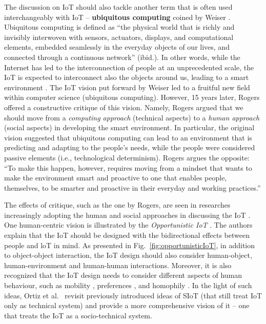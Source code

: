 The discussion on IoT should also tackle another term that is often used interchangeably with IoT -- \textbf{ubiquitous computing} coined by Weiser \cite{weiser1991computer}. Ubiquitous computing is defined as ``the physical world that is richly and invisibly interwoven with sensors, actuators, displays, and computational elements, embedded seamlessly in the everyday objects of our lives, and connected through a continuous network'' (ibid.). In other words, while the Internet has led to the interconnection of people at an unprecedented scale, the IoT is expected to interconnect also the objects around us, leading to a smart environment \cite{gubbi2013internet}. %
The IoT vision put forward by Weiser \cite{weiser1991computer} led to a fruitful new field within computer science (ubiquitous computing). However, 15 years later, Rogers \cite{rogers2006moving} offered a constructive critique of this vision. Namely, Rogers argued that we should move from a \textit{computing approach} (technical aspects) to a \textit{human approach} (social aspects) in developing the smart environment. In particular, the original vision suggested that ubiquitous computing can lead to an environment that is predicting and adapting to the people's needs, while the people were considered passive elements (i.e., technological determinism). Rogers argues the opposite: ``To make this happen, however, requires moving from a mindset that wants to make the environment smart and proactive to one that enables people, themselves, to be smarter and proactive in their everyday and working practices.''

The effects of critique, such as the one by Rogers, are seen in researches increasingly adopting the human and social approaches in discussing the IoT \cite{ning2011future,guo2012opportunistic,tomasini2017effect}. One human-centric vision is illustrated by the \textit{Opportunistic IoT} \cite{guo2012opportunistic,guo2013opportunistic}. The authors explain that the IoT should be designed with the bidirectional effects between people and loT in mind. As presented in Fig.\ \ref{fig:opportunisticIoT}, in addition to object-object interaction, the IoT design should also consider human-object, human-environment and human-human interactions. Moreover, it is also recognized that the IoT design needs to consider different aspects of human behaviour, such as mobility \cite{tomasini2017effect}, preferences \cite{kowshalya2016community}, and homophily \cite{atzori2012social}. In the light of such ideas, Ortiz et al.\ \cite{ortiz2014cluster} revisit previously introduced ideas of {SIoT} (that still treat IoT only as technical system) and provide a more comprehensive vision of it -- one that treats the IoT as a socio-technical system.

